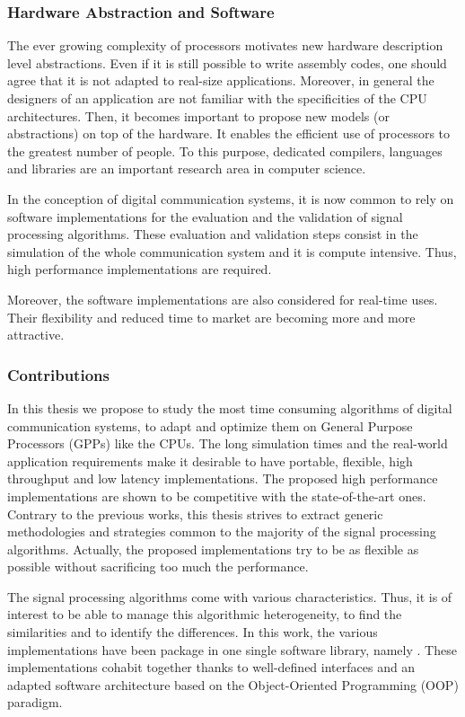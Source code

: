 \subsubsection*{Hardware Abstraction and Software}

The ever growing complexity of processors motivates new hardware description
level abstractions. Even if it is still possible to write assembly codes, one
should agree that it is not adapted to real-size applications. Moreover, in
general the designers of an application are not familiar with the specificities
of the CPU architectures. Then, it becomes important to propose new models (or
abstractions) on top of the hardware. It enables the efficient use of processors
to the greatest number of people. To this purpose, dedicated compilers,
languages and libraries are an important research area in computer science.

In the conception of digital communication systems, it is now common to rely on
software implementations for the evaluation and the validation of signal
processing algorithms. These evaluation and validation steps consist in
the simulation of the whole communication system and it is compute intensive.
Thus, high performance implementations are required.

Moreover, the software implementations are also considered for real-time uses.
Their flexibility and reduced time to market are becoming more and more
attractive.

\subsubsection*{Contributions}

In this thesis we propose to study the most time consuming algorithms of digital
communication systems, to adapt and optimize them on General Purpose Processors
(GPPs) like the CPUs. The long simulation times and the real-world application
requirements make it desirable to have portable, flexible, high throughput and
low latency implementations. The proposed high performance implementations are
shown to be competitive with the state-of-the-art ones. Contrary to the previous
works, this thesis strives to extract generic methodologies and strategies
common to the majority of the signal processing algorithms. Actually, the
proposed implementations try to be as flexible as possible without sacrificing
too much the performance.

The signal processing algorithms come with various characteristics. Thus, it is
of interest to be able to manage this algorithmic heterogeneity, to find the
similarities and to identify the differences. In this work, the various
implementations have been package in one single software library, namely
\AFFECT. These implementations cohabit together thanks to well-defined
interfaces and an adapted software architecture based on the Object-Oriented
Programming (OOP) paradigm.

